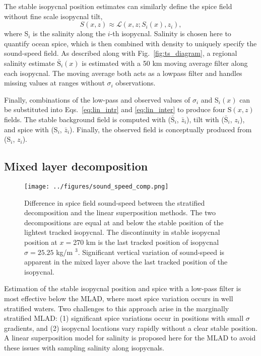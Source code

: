 \documentclass[preprint,NumberedRefs]{JASA}
\begin{document}
The stable isopycnal position estimates can similarly define the spice field without fine scale isopycnal tilt,
\begin{equation}
    S(x, z)\approx\mathcal{L}(x, z; S_i(x), z_i),
    \label{eq:lin_inter}
\end{equation}
where S$_i$ is the salinity along the $i$-th isopycnal. Salinity is chosen here to quantify ocean spice, which is then combined with density to uniquely specify the sound-speed field\citep{TEOS10}. As described along with Fig.~\ref{fig:ts_diagram}, a regional salinity estimate $\bar{\textrm{S}}_i(x)$ is estimated with a 50 km moving average filter along each isopycnal. The moving average both acts as a lowpass filter and handles missing values at ranges without $\sigma_i$ observations.

Finally, combinations of the low-pass and observed values of $\sigma_i$ and S$_i(x)$ can be substituted into Eqs.~\eqref{eq:lin_intr} and \eqref{eq:lin_inter} to produce four S$(x,z)$ fields. The stable background field is computed with ($\bar{\textrm{S}}_i$, $\bar{z}_i$), tilt with ($\bar{\textrm{S}}_i$, $z_i$), and spice with (S$_i$, $\bar{z}_i$). Finally, the observed field is conceptually produced from (S$_i$, $z_i$).

\subsection{Mixed layer decomposition}\label{ssec:ml_decomp}
\begin{figure}
\texttt{[image: ../figures/sound\_speed\_comp.png]}
    \caption{\label{fig:c_diff}{Difference in spice field sound-speed between the stratified decomposition and the linear superposition methods. The two decompositions are equal at and below the stable position of the lightest tracked isopycnal. The discontinuity in stable isopycnal position at $x=$270 km is the last tracked position of isopycnal $\sigma=25.25$ kg/m $^3$. Significant vertical variation of sound-speed is apparent in the mixed layer above the last tracked position of the isopycnal.}}
\end{figure}

Estimation of the stable isopycnal position and spice with a low-pass filter is most effective below the MLAD, where most spice variation occurs in well stratified waters. Two challenges to this approach arise in the marginally stratified MLAD: (1) significant spice variations occur in positions with small $\sigma$ gradients, and (2) isopycnal locations vary rapidly without a clear stable position. A linear superposition model for salinity is proposed here for the MLAD to avoid these issues with sampling salinity along isopycnals.
\end{document}
